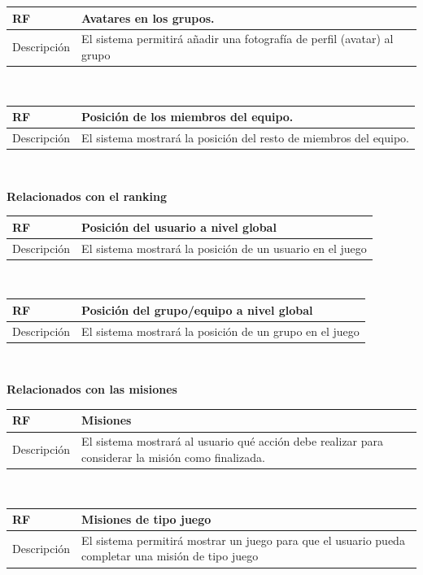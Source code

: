 \documentclass[twoside]{report}
\newcommand\addrow[2]{#1 &#2\\ }
\newcommand\addheading[2]{#1 &#2\\ \hline}
\newcommand\tabularhead{\begin{tabular}{lp{0.7\textwidth}}
\hline
}
\newenvironment{req}{\tabularhead}
{\hline\end{tabular}}
\begin{document}
\begin{req}
	\addheading{\textbf{RF\arabic{functionalRequirements}}}{Avatares en los grupos.}
	\addrow{Descripción}{El sistema permitirá añadir una fotografía de perfil (avatar) al grupo}
\end{req}\\

\begin{req}
	\addheading{\textbf{RF\arabic{functionalRequirements}}}{Posición de los miembros del equipo.}
	\addrow{Descripción}{El sistema mostrará la posición del resto de miembros del equipo. }
\end{req}\\

\textbf{Relacionados con el ranking}\\

\begin{req}
	\addheading{\textbf{RF\arabic{functionalRequirements}}}{Posición del usuario a nivel global}
	\addrow{Descripción}{El sistema mostrará la posición de un usuario en el juego}
\end{req}\\

\begin{req}
	\addheading{\textbf{RF\arabic{functionalRequirements}}}{Posición del grupo/equipo a nivel global}
	\addrow{Descripción}{El sistema mostrará la posición de un grupo en el juego}
\end{req}\\

\textbf{Relacionados con las misiones}\\

\begin{req}
	\addheading{\textbf{RF\arabic{functionalRequirements}}}{Misiones}
	\addrow{Descripción}{El sistema mostrará al usuario qué acción debe realizar para considerar la misión como finalizada.}
\end{req}\\

\begin{req}
	\addheading{\textbf{RF\arabic{functionalRequirements}}}{Misiones de tipo juego}
	\addrow{Descripción}{El sistema permitirá mostrar un juego para que el usuario pueda completar una misión de tipo juego}
\end{req}\\
\end{document}
